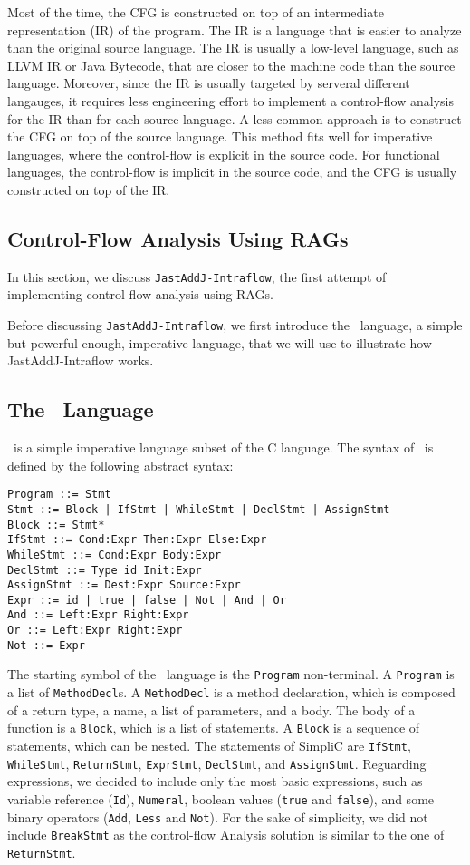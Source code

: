 Most of the time, the CFG is constructed on top of an intermediate representation
(IR) of the program. The IR is a language that is easier to analyze than the original
source language. The IR is usually a low-level language, such as LLVM IR or Java Bytecode, that are
closer to the machine code than the source language. 
Moreover, since the IR is usually targeted by serveral different langauges, 
it requires less engineering effort to implement a control-flow analysis for the IR than for each
source language.
A less common approach is to construct the CFG on top of the source language.
This method fits well for imperative languages, where the control-flow is 
explicit in the source code. For functional languages, the
control-flow is implicit in the source code, and the CFG is usually constructed
on top of the IR.




\subsection{Control-Flow Analysis Using RAGs}
\label{sec:cfarag}
In this section, we discuss \texttt{JastAddJ-Intraflow}, the first attempt of 
implementing control-flow analysis using RAGs.

Before discussing \texttt{JastAddJ-Intraflow}, we first introduce the 
\bnc\ language, a simple but powerful enough,  imperative language, that we 
will use to illustrate how JastAddJ-Intraflow works.


\subsection{The \bnc\ Language}
\bnc\ is a simple imperative language subset of the C language.
The syntax of \bnc\ is defined by the following abstract syntax:
\begin{lstlisting}[caption={Syntax of the \bnc\ language}]
Program ::= Stmt
Stmt ::= Block | IfStmt | WhileStmt | DeclStmt | AssignStmt
Block ::= Stmt*
IfStmt ::= Cond:Expr Then:Expr Else:Expr
WhileStmt ::= Cond:Expr Body:Expr
DeclStmt ::= Type id Init:Expr
AssignStmt ::= Dest:Expr Source:Expr
Expr ::= id | true | false | Not | And | Or
And ::= Left:Expr Right:Expr
Or ::= Left:Expr Right:Expr
Not ::= Expr
\end{lstlisting}
The starting symbol of the \bnc\ language is the \texttt{Program} non-terminal.
A \texttt{Program} is a list of \texttt{MethodDecl}s. A \texttt{MethodDecl} is a method
declaration, which is composed of a return type, a name, a list of parameters, and a body.
The body of a function is a \texttt{Block}, which is a list of statements. A \texttt{Block}
is a sequence of statements, which can be nested. The statements of SimpliC are
\texttt{IfStmt}, \texttt{WhileStmt}, \texttt{ReturnStmt}, \texttt{ExprStmt}, \texttt{DeclStmt},
and \texttt{AssignStmt}. Reguarding expressions, we decided to include only the most basic
expressions, such as variable reference (\texttt{Id}),  \texttt{Numeral}, boolean values (\texttt{true} and \texttt{false}),
and some binary operators (\texttt{Add}, \texttt{Less} and \texttt{Not}).
For the sake of simplicity, we did not include \texttt{BreakStmt} as the control-flow Analysis
solution is similar to the one of \texttt{ReturnStmt}. 

